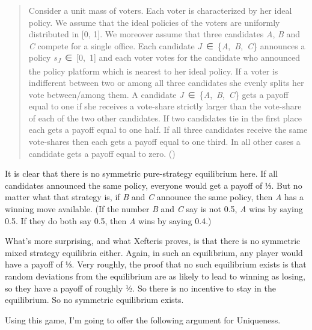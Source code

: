 \documentclass[
  11pt,
  letterpaper,
  DIV=11,
  numbers=noendperiod,
  twoside]{scrartcl}
\begin{document}
\begin{quote}
Consider a unit mass of voters. Each voter is characterized by her ideal
policy. We assume that the ideal policies of the voters are uniformly
distributed in {[}0, 1{]}. We moreover assume that three candidates
\emph{A}, \emph{B} and \emph{C} compete for a single office. Each
candidate \emph{J}~∈~\{\emph{A},~\emph{B},~\emph{C}\} announces a policy
\emph{s\textsubscript{J}}~∈~{[}0,~1{]} and each voter votes for the
candidate who announced the policy platform which is nearest to her
ideal policy. If a voter is indifferent between two or among all three
candidates she evenly splits her vote between/among them. A candidate
\emph{J}~∈~\{\emph{A},~\emph{B},~\emph{C}\} gets a payoff equal to one
if she receives a vote-share strictly larger than the vote-share of each
of the two other candidates. If two candidates tie in the first place
each gets a payoff equal to one half. If all three candidates receive
the same vote-shares then each gets a payoff equal to one third. In all
other cases a candidate gets a payoff equal to zero.
()
\end{quote}

It is clear that there is no symmetric pure-strategy equilibrium here.
If all candidates announced the same policy, everyone would get a payoff
of ⅓. But no matter what that strategy is, if \emph{B} and \emph{C}
announce the same policy, then \emph{A} has a winning move available.
(If the number \emph{B} and \emph{C} say is not 0.5, \emph{A} wins by
saying 0.5. If they do both say 0.5, then \emph{A} wins by saying 0.4.)

What's more surprising, and what Xefteris proves, is that there is no
symmetric mixed strategy equilibria either. Again, in such an
equilibrium, any player would have a payoff of ⅓. Very roughly, the
proof that no such equilibrium exists is that random deviations from the
equilibrium are as likely to lead to winning as losing, so they have a
payoff of roughly ½. So there is no incentive to stay in the
equilibrium. So no symmetric equilibrium exists.

Using this game, I'm going to offer the following argument for
Uniqueness.
\end{document}
